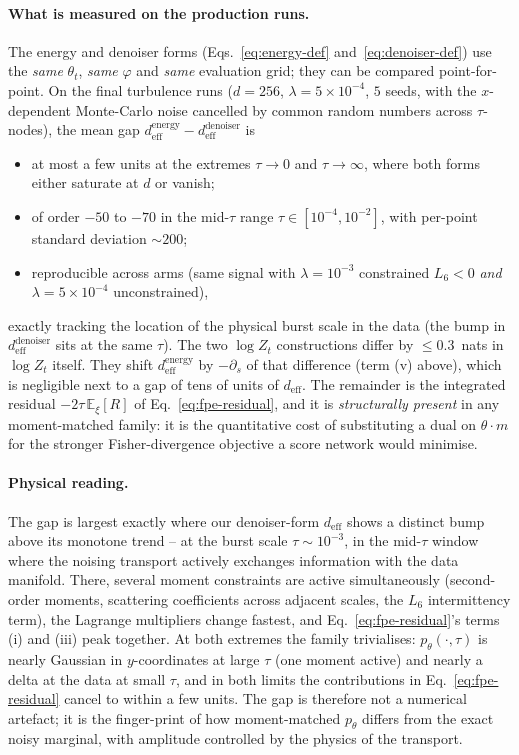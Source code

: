 \documentclass[11pt]{article}
\newcommand{\E}{\mathbb{E}}
\renewcommand{\_}{\origunderscore\allowbreak}
\newcommand{\deff}{d_{\mathrm{eff}}}
\begin{document}
\paragraph{What is measured on the production runs.} The energy and
denoiser forms (Eqs.~\ref{eq:energy-def} and~\ref{eq:denoiser-def}) use the
\emph{same} $\theta_t$, \emph{same} $\varphi$ and \emph{same} evaluation
grid; they can be compared point-for-point. On the final turbulence runs
($d{=}256$, $\lambda{=}5\!\times\!10^{-4}$, $5$ seeds, with the $x$-dependent
Monte-Carlo noise cancelled by common random numbers across $\tau$-nodes),
the mean gap $\deff^{\mathrm{energy}}-\deff^{\mathrm{denoiser}}$ is
\begin{itemize}
  \item at most a few units at the extremes $\tau\to0$ and $\tau\to\infty$,
        where both forms either saturate at $d$ or vanish;
  \item of order $-50$ to $-70$ in the mid-$\tau$ range
        $\tau\in[10^{-4},10^{-2}]$, with per-point standard deviation
        $\sim 200$;
  \item reproducible across arms (same signal with $\lambda{=}10^{-3}$
        constrained $L_6{<}0$ \emph{and} $\lambda{=}5\!\times\!10^{-4}$
        unconstrained),
\end{itemize}
exactly tracking the location of the physical burst scale in the data (the
bump in $\deff^{\mathrm{denoiser}}$ sits at the same $\tau$). The two $\log Z_t$
constructions differ by $\leq 0.3$~nats in $\log Z_t$ itself. They shift
$\deff^{\mathrm{energy}}$ by $-\partial_s$ of that difference (term (v)
above), which is negligible next to a gap of tens of units of $\deff$. The remainder
is the integrated residual $-2\tau\,\E_\xi[R]$ of
Eq.~\ref{eq:fpe-residual}, and it is \emph{structurally present} in any
moment-matched family: it is the quantitative cost of substituting a dual
on $\theta\cdot m$ for the stronger Fisher-divergence objective a score
network would minimise.

\paragraph{Physical reading.} The gap is largest exactly where our
denoiser-form $\deff$ shows a distinct bump above its monotone trend --
at the burst scale $\tau\sim 10^{-3}$, in the mid-$\tau$ window where the
noising transport actively exchanges information with the data manifold.
There, several moment constraints are active simultaneously (second-order
moments, scattering coefficients across adjacent scales, the $L_6$
intermittency term), the Lagrange multipliers change fastest, and
Eq.~\ref{eq:fpe-residual}'s terms (i) and (iii) peak together. At both
extremes the family trivialises: $p_\theta(\cdot,\tau)$ is nearly Gaussian
in $y$-coordinates at large $\tau$ (one moment active) and nearly a delta
at the data at small $\tau$, and in both limits the contributions in
Eq.~\ref{eq:fpe-residual} cancel to within a few units. The gap is
therefore not a numerical artefact; it is the finger-print of how
moment-matched $p_\theta$ differs from the exact noisy marginal, with
amplitude controlled by the physics of the transport.
\end{document}
